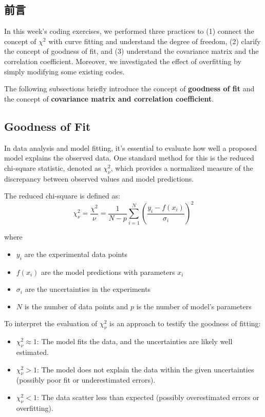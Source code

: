 \documentclass[12pt,a4paper]{article}
\begin{document}
\begin{CJK}{UTF8}{bkai}
\section{前言}
\hfill

In this week's coding exercises, we performed three practices to (1) connect the concept of $\chi^2$ with curve fitting and understand the degree of freedom, (2) clarify the concept of goodness of fit, and (3) understand the covariance matrix and the correlation coefficient. Moreover, we investigated the effect of overfitting by simply modifying some existing codes. 

The following subsections briefly introduce the concept of \textbf{goodness of fit} and the concept of \textbf{covariance matrix and correlation coefficient}.

\subsection{Goodness of Fit}\label{subsec:goodness}
\hfill

In data analysis and model fitting, it's essential to evaluate how well a proposed model explains the observed data. One standard method for this is the reduced chi-square statistic, denoted as $\chi^2_{\nu}$, which provides a normalized measure of the discrepancy between observed values and model predictions.

The reduced chi-square is defined as:
\begin{equation}\label{eq:reduced_chi}
    \chi^2_{\nu} = \frac{\chi^2}{\nu} = \frac{1}{N-p}\sum^{N}_{i=1}\left(\frac{y_i-f(x_i)}{\sigma_i}\right)^2
\end{equation}

where
\begin{itemize}
    \item $y_i$ are the experimental data points
    \item $f(x_i)$ are the model predictions with parameters $x_i$
    \item $\sigma_{i}$ are the uncertainties in the experiments
    \item $N$ is the number of data points and $p$ is the number of model's parameters
\end{itemize}

To interpret the evaluation of $\chi^2_{\nu}$ is an approach to testify the goodness of fitting:
\begin{itemize}
    \item $\chi^2_{\nu} \approx1$: The model fits the data, and the uncertainties are likely well estimated.
    \item $\chi^2_{\nu} >1$: The model does not explain the data within the given uncertainties (possibly poor fit or underestimated errors).
    \item $\chi^2_{\nu} <1$: The data scatter less than expected (possibly overestimated errors or overfitting).
\end{itemize}



\end{CJK}
\end{document}
